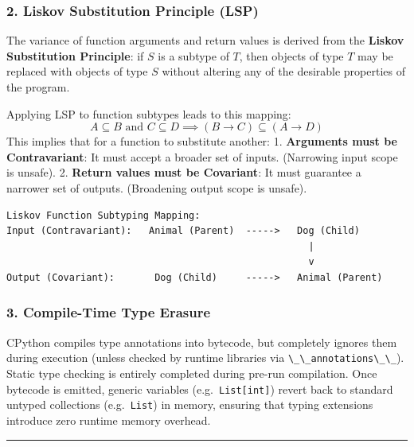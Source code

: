 \hypertarget{liskov-substitution-principle-lsp}{%
\subsubsection{2. Liskov Substitution Principle
(LSP)}\label{liskov-substitution-principle-lsp}}

The variance of function arguments and return values is derived from the
\textbf{Liskov Substitution Principle}: if \(S\) is a subtype of \(T\),
then objects of type \(T\) may be replaced with objects of type \(S\)
without altering any of the desirable properties of the program.

Applying LSP to function subtypes leads to this mapping:
\[A \subseteq B \text{ and } C \subseteq D \implies (B \to C) \subseteq (A \to D)\]
This implies that for a function to substitute another: 1.
\textbf{Arguments must be Contravariant}: It must accept a broader set
of inputs. (Narrowing input scope is unsafe). 2. \textbf{Return values
must be Covariant}: It must guarantee a narrower set of outputs.
(Broadening output scope is unsafe).

\begin{lstlisting}
Liskov Function Subtyping Mapping:
Input (Contravariant):   Animal (Parent)  ----->   Dog (Child)
                                                     |
                                                     v
Output (Covariant):       Dog (Child)     ----->   Animal (Parent)
\end{lstlisting}

\hypertarget{compile-time-type-erasure}{%
\subsubsection{3. Compile-Time Type
Erasure}\label{compile-time-type-erasure}}

CPython compiles type annotations into bytecode, but completely ignores
them during execution (unless checked by runtime libraries via
\passthrough{\lstinline!\_\_annotations\_\_!}). Static type checking is
entirely completed during pre-run compilation. Once bytecode is emitted,
generic variables (e.g.~\passthrough{\lstinline!List[int]!}) revert back
to standard untyped collections (e.g.~\passthrough{\lstinline!List!}) in
memory, ensuring that typing extensions introduce zero runtime memory
overhead.

\begin{center}\rule{0.5\linewidth}{0.5pt}\end{center}
